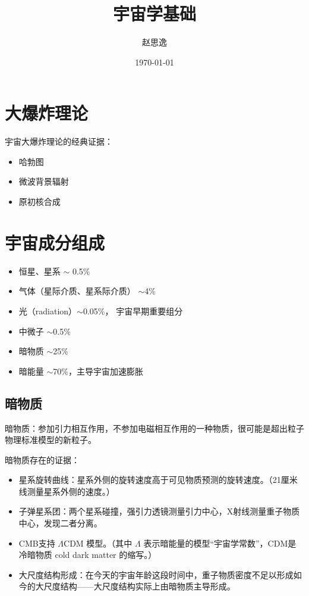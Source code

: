 \documentclass[]{ctexart}
\title{宇宙学基础}
\author{赵思逸}
\date{\today}
\begin{document}
\maketitle



\tableofcontents

\newpage

\section{大爆炸理论}

宇宙大爆炸理论的经典证据：
\begin{itemize}
	\item 哈勃图
    \item 微波背景辐射
    \item 原初核合成
\end{itemize}

\section{宇宙成分组成}

\begin{itemize}
	\item 恒星、星系 $\sim$ 0.5\%
    \item 气体（星际介质、星系际介质） $\sim$4\%
    \item 光（radiation）$\sim$0.05\%， 宇宙早期重要组分
    \item 中微子 $\sim$0.5\%
    \item 暗物质 $\sim$25\%
    \item 暗能量 $\sim$70\%，主导宇宙加速膨胀
\end{itemize}

\subsection{暗物质}

\par 暗物质：参加引力相互作用，不参加电磁相互作用的一种物质，很可能是超出粒子物理标准模型的新粒子。

暗物质存在的证据：
\begin{itemize}
	\item 星系旋转曲线：星系外侧的旋转速度高于可见物质预测的旋转速度。（21厘米线测量星系外侧的速度。）
    \item 子弹星系团：两个星系碰撞，强引力透镜测量引力中心，X射线测量重子物质中心，发现二者分离。
    \item CMB支持 $\Lambda$CDM 模型。（其中 $\Lambda$ 表示暗能量的模型“宇宙学常数”，CDM是冷暗物质 cold dark matter 的缩写。）
    \item 大尺度结构形成：在今天的宇宙年龄这段时间中，重子物质密度不足以形成如今的大尺度结构——大尺度结构实际上由暗物质主导形成。
\end{itemize}
\end{document}
